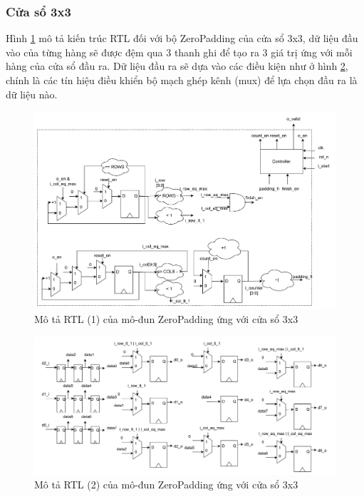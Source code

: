 \subsubsection{Cửa sổ 3x3}
Hình \ref{fig:zero3x3Architecture1} mô tả kiến trúc RTL đối với bộ ZeroPadding của cửa sổ 3x3, dữ liệu đầu vào của từng hàng sẽ được đệm qua 3 thanh ghi để tạo ra 3 giá trị ứng với mỗi hàng của cửa sổ đầu ra. Dữ liệu đầu ra sẽ dựa vào các điều kiện như ở hình \ref{fig:zero3x3Architecture2}, chính là các tín hiệu điều khiển bộ mạch ghép kênh (mux) để lựa chọn đầu ra là dữ liệu nào.
\begin{figure}[!ht]
    \centering
    \includegraphics[width=\linewidth]{figures/zero3x3Architecture1.png}
    \caption{Mô tả RTL (1) của mô-đun ZeroPadding ứng với cửa sổ 3x3}
    \label{fig:zero3x3Architecture1}
\end{figure}

\begin{figure}[!ht]
    \centering
    \includegraphics[width=\linewidth]{figures/zero3x3Architecture2.png}
    \caption{Mô tả RTL (2) của mô-đun ZeroPadding ứng với cửa sổ 3x3}
    \label{fig:zero3x3Architecture2}
\end{figure}


